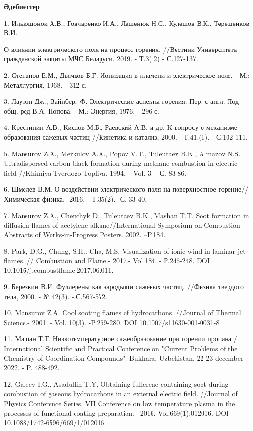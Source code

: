 \begin{center}
{\bfseries Әдебиеттер}
\end{center}

\begin{noparindent}
1. Ильюшонок А.В., Гончаренко И.А., Лешенюк Н.С., Кулешов В.К.,
Терешенков В.И.

О влиянии электрического поля на процесс горения. //Вестник Университета
гражданской защиты МЧС Беларуси. 2019. - Т.3( 2) - С.127-137.

2. Степанов Е.М., Дьячков Б.Г. Ионизация в пламени и электрическое поле.
- М.: Металлургия, 1968. - 312 с.

3. Лаутон Дж., Вайнберг Ф. Электрические аспекты горения. Пер. с англ.
Под общ. ред В.А. Попова. - М.: Энергия, 1976. - 296 с.

4. Крестинин А.В., Кислов М.Б., Раевский А.В. и др. K вопросу о
механизме образования сажевых частиц //Кинетика и катализ, 2000. -
Т.41.(1). - С.102-111.

5. Mansurov Z.A., Merkulov A.A., Popov V.T., Tuleutaev B.K., Almazov
N.S. Ultradispersed carbon black formation during methane combustion in
electric field //Khimiya Tverdogo Topliva. 1994. -- Vol. 3. - С. 83-86.

6. Шмелев В.М. О воздействии электрического поля на поверхностное
горение//Химическая физика.- 2016. - Т.35(2).- С. 33-40.

7. Mansurov Z.A., Chenchyk D., Tuleutaev B.K., Mashan T.T. Soot
formation in diffusion flames of acetylene-alkane//International
Symposium on Combustion Abstracts of Works-in-Progress Posters. 2002.
--P.184.

8. Park, D.G., Chung, S.H., Cha, M.S. Visualization of ionic wind in
laminar jet flames. // Combustion and Flame.- 2017.- Vol.184. -
Р.246-248. DOI 10.1016/j.combustflame.2017.06.011.

9. Березкин В.И. Фуллерены как зародыши сажевых частиц. //Физика
твердого тела, 2000. - № 42(3). - С.567-572.

10. Mansurov Z.A. Cool sooting flames of hydrocarbons. //Journal of
Thermal Science.- 2001. - Vol. 10(3). -P.269-280. DOI
10.1007/s11630-001-0031-8

11. Машан Т.Т. Низкотемпературное сажеобразование при горении пропана /
International Scientific and Practical Conference on "Current Problems
of the Chemistry of Coordination Compounds". Bukhara, Uzbekistan.
22-23-december 2022. - P. 488-492.

12. Galeev I.G., Asadullin T.Y. Obtaining fullerene-containing soot
during combustion of gaseous hydrocarbons in an external electric field.
//Journal of Physics Conference Series. VII Conference on low
temperature plasma in the processes of functional coating preparation.
--2016.-Vol.669(1):012016. DOI 10.1088/1742-6596/669/1/012016
\end{noparindent}

